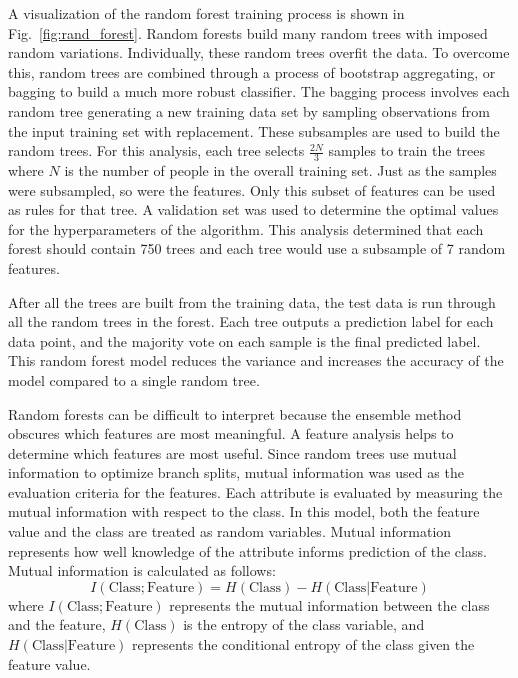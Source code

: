 \documentclass[10pt,twocolumn,conference]{IEEEtran}
\begin{document}
A visualization of the random forest training process is shown in Fig.~\ref{fig:rand_forest}.
Random forests build many random trees with imposed random variations.
Individually, these random trees overfit the data.
To overcome this, random trees are combined through a process of bootstrap aggregating, or bagging to build a much more robust classifier.
The bagging process involves each random tree generating a new training data set by sampling observations from the input training set with replacement.
These subsamples are used to build the random trees.
For this analysis, each tree selects $\frac{2N}{3}$ samples to train the trees where $N$ is the number of people in the overall training set.
Just as the samples were subsampled, so were the features.
Only this subset of features can be used as rules for that tree.
A validation set was used to determine the optimal values for the hyperparameters of the algorithm.
This analysis determined that each forest should contain 750 trees and each tree would use a subsample of 7 random features.

After all the trees are built from the training data, the test data is run through all the random trees in the forest.
Each tree outputs a prediction label for each data point, and the majority vote on each sample is the final predicted label.
This random forest model reduces the variance and increases the accuracy of the model compared to a single random tree.

Random forests can be difficult to interpret because the ensemble method obscures which features are most meaningful.
A feature analysis helps to determine which features are most useful.
Since random trees use mutual information to optimize branch splits, mutual information was used as the evaluation criteria for the features.
Each attribute is evaluated by measuring the mutual information with respect to the class.
In this model, both the feature value and the class are treated as random variables.
Mutual information represents how well knowledge of the attribute informs prediction of the class.
Mutual information is calculated as follows:
\begin{equation}
I(\text{Class}; \text{Feature}) = H(\text{Class}) - H(\text{Class} | \text{Feature})
\end{equation} \label{eq:info_gained}
\hspace{-\parindent}
where $I(\text{Class}; \text{Feature})$ represents the mutual information between the class and the feature, $H(\text{Class})$ is the entropy of the class variable, and  $H(\text{Class} | \text{Feature})$ represents the conditional entropy of the class given the feature value.  
\end{document}
